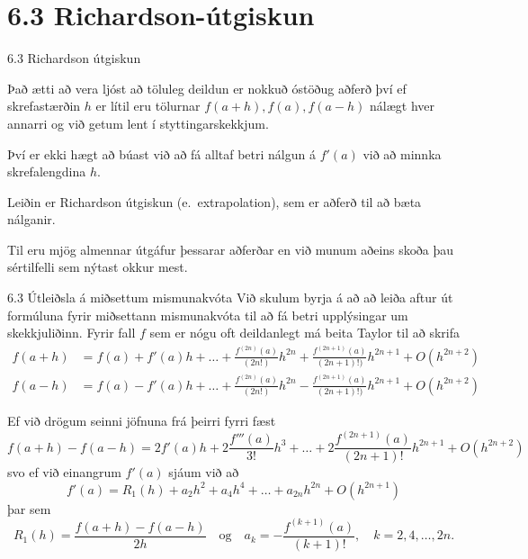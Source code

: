 \section*{6.3 Richardson-útgiskun}
\begin{frame}{6.3 Richardson útgiskun} 

Það ætti að vera ljóst að töluleg deildun er nokkuð óstöðug aðferð því
ef skrefastærðin $h$ er lítil eru tölurnar $f(a+h), f(a), f(a-h)$
nálægt hver annarri og við getum lent í styttingarskekkjum. 

\pause
\smallskip
Því er ekki hægt að búast við að fá alltaf betri nálgun á $f'(a)$ við að
minnka skrefalengdina $h$. 

\pause
\smallskip
Leiðin  er Richardson útgiskun (e.~extrapolation), sem er aðferð til
að bæta nálganir.

\pause
\smallskip
Til eru mjög almennar útgáfur þessarar aðferðar en
við munum aðeins skoða þau sértilfelli sem nýtast okkur mest.
\end{frame}


\begin{frame}{6.3 Útleiðsla á miðsettum mismunakvóta} 
Við skulum byrja á að að leiða aftur út formúluna fyrir miðsettann
mismunakvóta til að fá betri upplýsingar um skekkjuliðinn. Fyrir fall
$f$ sem er nógu oft deildanlegt má beita Taylor til að skrifa 
{\small\begin{align*}
  f(a+h) &= f(a) + f'(a)h %
  + \ldots
  + \frac{f^{(2n)}(a)}{(2n!)}h^{2n}
  + \frac{f^{(2n+1)}(a)}{(2n+1)!)}h^{2n+1} + O(h^{2n+2}) \\
  f(a-h) &= f(a) - f'(a)h 
  + \ldots
  + \frac{f^{(2n)}(a)}{(2n!)}h^{2n}
  - \frac{f^{(2n+1)}(a)}{(2n+1)!)}h^{2n+1} + O(h^{2n+2})
\end{align*}}

\pause
Ef við drögum seinni jöfnuna  frá þeirri fyrri fæst
{\small\begin{equation*}
  f(a+h)-f(a-h) = 2f'(a)h + 2\frac{f'''(a)}{3!}h^3
  + \ldots + 2\frac{f^{(2n+1)}(a)}{(2n+1)!}h^{2n+1} + O(h^{2n+2})
\end{equation*}}\pause
svo ef við einangrum $f'(a)$ sjáum við að
\begin{equation*}
  f'(a) = R_1(h) 
  + a_2 h^2 + a_4 h^4 + \ldots + a_{2n} h^{2n} + O(h^{2n+1})
\end{equation*}
þar sem
\begin{equation*}
  R_1(h) = \frac{f(a+h)-f(a-h)}{2h}
  \quad \text{og} \quad
  a_k = -\frac{f^{(k+1)}(a)}{(k+1)!},
  \quad k = 2,4,\ldots,2n.
\end{equation*}
\end{frame}


